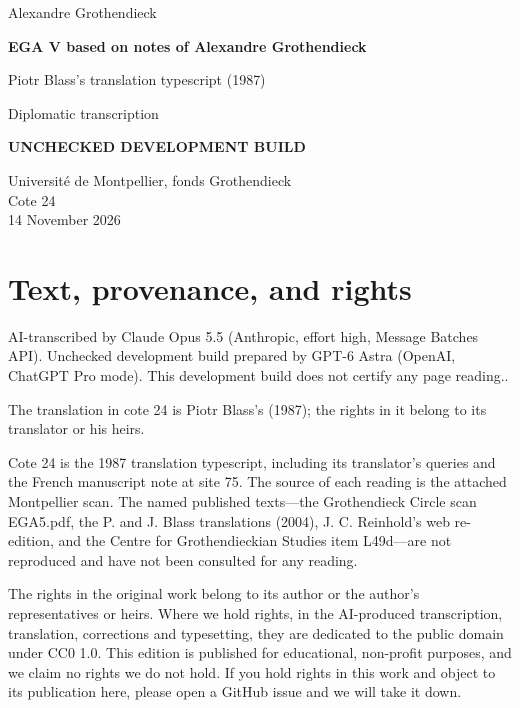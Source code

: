 \documentclass[10pt,a4paper]{article}
\newcommand{\EditionForm}{Diplomatic transcription}
\begin{document}
\hypersetup{pageanchor=false}\begin{titlepage}\thispagestyle{empty}\vspace*{20mm}
{\Large Alexandre Grothendieck\par}\vspace{12mm}
{\Huge\bfseries EGA V based on notes of Alexandre Grothendieck\par}\vspace{8mm}
{\Large Piotr Blass's translation typescript (1987)\par}\vspace{7mm}
{\large\EditionForm\par}\vspace{12mm}
{\large\bfseries\color{deletedred}UNCHECKED DEVELOPMENT BUILD\par}\vspace{10mm}
Université de Montpellier, fonds Grothendieck\\ Cote 24\\
14 November 2026
\vfill\end{titlepage}\clearpage\hypersetup{pageanchor=true}
\section*{Text, provenance, and rights}
AI-transcribed by Claude Opus 5.5 (Anthropic, effort high, Message Batches API). Unchecked development build prepared by GPT-6 Astra (OpenAI, ChatGPT Pro mode). This development build does not certify any page reading..

The translation in cote 24 is Piotr Blass's (1987); the rights in it belong to its translator or his heirs.

Cote 24 is the 1987 translation typescript, including its translator's queries and the French manuscript note at site 75. The source of each reading is the attached Montpellier scan. The named published texts---the Grothendieck Circle scan EGA5.pdf, the P. and J. Blass translations (2004), J. C. Reinhold's web re-edition, and the Centre for Grothendieckian Studies item L49d---are not reproduced and have not been consulted for any reading.

The rights in the original work belong to its author or the author's representatives or heirs. Where we hold rights, in the AI-produced transcription, translation, corrections and typesetting, they are dedicated to the public domain under CC0 1.0. This edition is published for educational, non-profit purposes, and we claim no rights we do not hold. If you hold rights in this work and object to its publication here, please open a GitHub issue and we will take it down.
\end{document}

